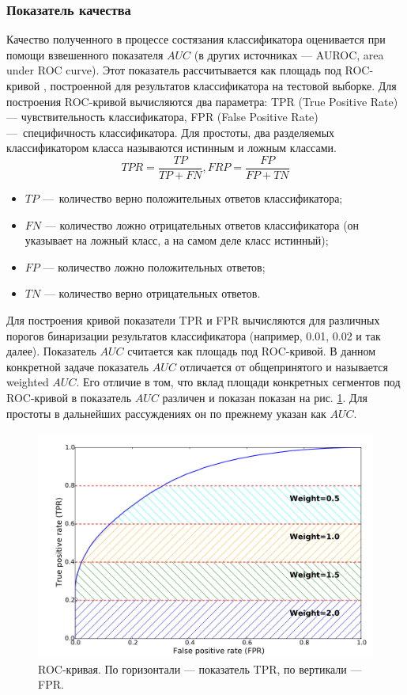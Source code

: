 \documentclass[14pt, a4paper]{extarticle}
\begin{document}
\subsubsection*{Показатель качества}
Качество полученного в процессе состязания классификатора оценивается при помощи взвешенного показателя $AUC$ (в других источниках — AUROC, area under ROC curve). Этот показатель рассчитывается как площадь под ROC-кривой \cite{roc_wiki}, построенной для результатов классификатора на тестовой выборке.
Для построения ROC-кривой вычисляются два параметра: TPR (True Positive Rate) — чувствительность классификатора, FPR (False Positive Rate) — специфичность классификатора. Для простоты, два разделяемых классификатором класса называются истинным и ложным классами.
\begin{equation*}
	TPR = \frac{TP}{TP + FN}, FRP = \frac{FP}{FP+TN}
\end{equation*}
\begin{itemize}
	\item $TP$ — количество верно положительных ответов классификатора;
	\item $FN$ — количество ложно отрицательных ответов классификатора (он указывает на ложный класс, а на самом деле класс истинный);
	\item $FP$ — количество ложно положительных ответов;
	\item $TN$ — количество верно отрицательных ответов.
\end{itemize}
Для построения кривой показатели TPR и FPR вычисляются для различных порогов бинаризации результатов классификатора (например, 0.01, 0.02 и так далее). Показатель $AUC$ считается как площадь под ROC-кривой. 
В данном конкретной задаче показатель $AUC$ отличается от общепринятого и называется weighted $AUC$. Его отличие в том, что вклад площади конкретных сегментов под ROC-кривой в показатель $AUC$ различен и показан показан на рис. \ref{figure:auc}. Для простоты в дальнейших рассуждениях он по прежнему указан как $AUC$.

\begin{figure}
	\includegraphics[scale=0.85]{auc.png}
	\caption{ROC-кривая. По горизонтали — показатель TPR, по вертикали — FPR.}
	\label{figure:auc}
\end{figure}
\end{document}

